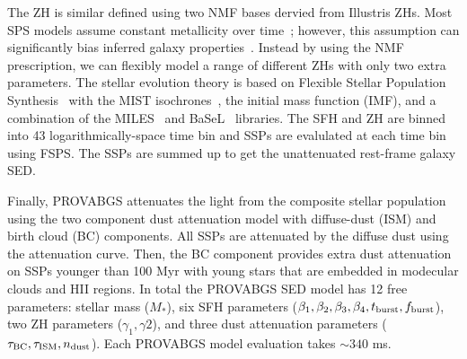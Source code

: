 The ZH is similar defined using two NMF bases dervied from Illustris ZHs. 
Most SPS models assume constant metallicity over
time~\citep[\emph{e.g.}][]{carnall2017, leja2019}; however, this assumption can
significantly bias inferred galaxy properties~\citep{thorne2021}. 
Instead by using the NMF prescription, we can flexibly model a range of
different ZHs with only two extra parameters.  
The stellar evolution theory is based on Flexible Stellar Population
Synthesis~\citep[FSPS;][]{conroy2009, conroy2010c} with the MIST
isochrones~\citep{paxton2011, paxton2013, paxton2015, choi2016, dotter2016},  
the \cite{chabrier2003} initial mass function (IMF), and a combination of the
MILES~\citep{sanchez-blazquez2006} and BaSeL~\citep{lejeune1997, lejeune1998,
westera2002} libraries.
The SFH and ZH are binned into 43 logarithmically-space time bin and SSPs are
evalulated at each time bin using FSPS. 
The SSPs are summed up to get the unattenuated rest-frame galaxy SED. 

Finally, PROVABGS attenuates the light from the composite stellar population
using the two component \cite{charlot2000} dust attenuation model with
diffuse-dust (ISM) and birth cloud (BC) components. 
All SSPs are attenuated by the diffuse dust using the \cite{kriek2013}
attenuation curve.
Then, the BC component provides extra dust attenuation on SSPs younger than 100
Myr with young stars that are embedded in modecular clouds and HII regions. 
In total the PROVABGS SED model has 12 free parameters: stellar mass ($M_*$),
six SFH parameters ($\beta_1, \beta_2, \beta_3, \beta_4, t_{\rm burst}, f_{\rm
burst}$), two ZH parameters ($\gamma_1, \gamma2$), and three dust attenuation
parameters ($\tau_{\rm BC}, \tau_{\rm ISM}, n_{\rm dust}$). 
Each PROVABGS model evaluation takes ${\sim}340$ ms. 


